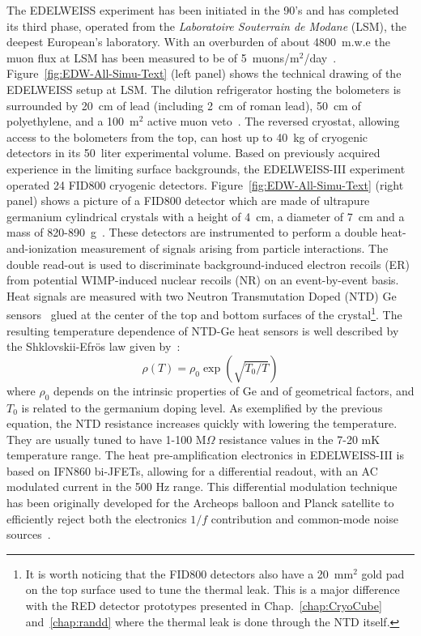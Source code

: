 The EDELWEISS experiment has been initiated in the 90's and has completed  its third phase, operated from the {\it Laboratoire Souterrain de Modane} (LSM), the deepest European's laboratory. With an overburden of about 4800~m.w.e the muon flux at LSM has been measured to be of 5~muons/m$^2$/day~\cite{Armengaud:2017rzu}. Figure~\ref{fig:EDW-All-Simu-Text} (left panel) shows the technical drawing of the EDELWEISS setup at LSM. The dilution refrigerator hosting the bolometers is surrounded by 20~cm of lead (including 2~cm of roman lead), 50~cm of polyethylene, and a 100~m$^2$ active muon veto~\cite{Armengaud:2017rzu}. The reversed cryostat, allowing access to the bolometers from the top, can host up to 40~kg of cryogenic detectors in its 50~liter experimental volume. Based on previously acquired experience in the limiting surface backgrounds, the EDELWEISS-III experiment operated 24 FID800 cryogenic detectors. Figure~\ref{fig:EDW-All-Simu-Text} (right panel) shows a picture of a FID800 detector which are made of ultrapure germanium cylindrical crystals with a height of 4~cm, a diameter of 7~cm and a mass of 820-890~g~\cite{Armengaud:2017rzu}. These detectors are instrumented to perform a double heat-and-ionization measurement of signals arising from particle interactions. The double read-out is used to discriminate background-induced electron recoils (ER) from potential WIMP-induced nuclear recoils (NR) on an event-by-event basis. \\

Heat signals are measured with two Neutron Transmutation Doped (NTD) Ge sensors~\cite{Armengaud:2017rzu} glued at the center of the top and bottom surfaces of the crystal\footnote{It is worth noticing that the FID800 detectors also have a 20~mm$^2$ gold pad on the top surface used to tune the thermal leak. This is a major difference with the RED detector prototypes presented in Chap.~\ref{chap:CryoCube} and~\ref{chap:randd} where the thermal leak is done through the NTD itself.}. The resulting temperature dependence of NTD-Ge heat sensors is well described by the Shklovskii-Efr\"os law given by~\cite{Mathimalar:2014sfa}:
\begin{equation}
    \rho(T) = \rho_0\exp(\sqrt{T_0/T})
\end{equation}
where $\rho_0$ depends on the intrinsic properties of Ge and of geometrical factors, and $T_0$ is related to the germanium doping level. As exemplified by the previous equation, the NTD resistance increases quickly with lowering the temperature. They are usually tuned to have 1-100 M$\Omega$ resistance values in the 7-20 mK temperature range. The heat pre-amplification electronics in EDELWEISS-III is based on IFN860 bi-JFETs, allowing for a differential readout, with an AC modulated current in the 500 Hz range. This differential modulation technique has been originally developed for the Archeops balloon and Planck satellite to efficiently reject both the electronics $1/f$ contribution and common-mode noise sources~\cite{Armengaud:2017rzu}. 



